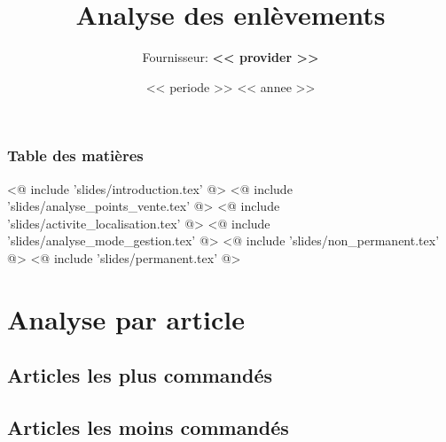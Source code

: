 \documentclass{beamer}
\title{Analyse des enlèvements}
\author{Fournisseur: \textbf{<< provider >>}}
\date{<< periode >> << annee >>}
\begin{document}
    \begin{frame}
        \titlepage
    \end{frame}

    \begin{frame}
        \frametitle{Table des matières}
        \tableofcontents
    \end{frame}

    <@ include 'slides/introduction.tex' @>
    <@ include 'slides/analyse_points_vente.tex' @>
    <@ include 'slides/activite_localisation.tex' @>
    <@ include 'slides/analyse_mode_gestion.tex' @>
    <@ include 'slides/non_permanent.tex' @>
    <@ include 'slides/permanent.tex' @>

    \section{Analyse par article}
    \subsection{Articles les plus commandés}

    \begin{frame}
    \end{frame}

    \subsection{Articles les moins commandés}

    \begin{frame}
    \end{frame}
\end{document}
